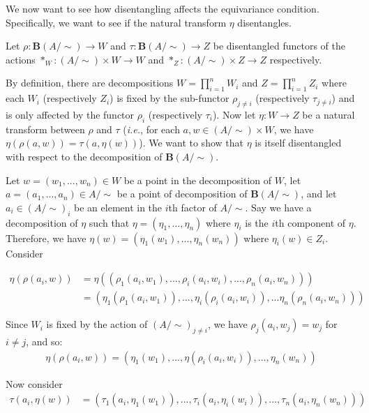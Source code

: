 We now want to see how disentangling affects the equivariance condition. Specifically, we want to see if the natural transform $\eta$ disentangles.

Let $\rho: \textbf{B}(A/\sim) \to W$ and $\tau: \textbf{B}(A/\sim) \to Z$ be disentangled functors of the actions $*_{W}: (A/\sim) \times W \to W$ and $*_{Z}: (A/\sim) \times Z \to Z$ respectively.


By definition, there are decompositions $W = \prod_{i=1}^{n} W_{i}$ and $Z = \prod_{i=1}^{n} Z_{i}$ where each $W_{i}$ (respectively $Z_{i}$) is fixed by the sub-functor $\rho_{j\neq i}$ (respectively $\tau_{j\neq i}$) and is only affected by the functor $\rho_{i}$ (respectively $\tau_{i}$).
Now let $\eta: W \to Z$ be a natural transform between $\rho$ and $\tau$ (\textit{i.e.}, for each $a, w \in (A/\sim) \times W$, we have $\eta(\rho(a, w)) = \tau(a, \eta(w))$).
We want to show that $\eta$ is itself disentangled with respect to the decomposition of $\textbf{B}(A/\sim)$.

Let $w = (w_{1},..., w_{n}) \in W$ be a point in the decomposition of $W$, let $a = (a_{1},...,a_{n}) \in A/\sim$ be a point of decomposition of $\textbf{B}(A/\sim)$, and let $a_{i} \in (A/\sim)_{i}$ be an element in the $i$th factor of $A/\sim$.
Say we have a decomposition of $\eta$ such that $\eta = (\eta_{1}, ..., \eta_{n})$ where $\eta_{i}$ is the $i$th component of $\eta$.
Therefore, we have $\eta(w) = (\eta_{1}(w_{1}), ..., \eta_{n}(w_{n}))$ where $\eta_{i}(w) \in Z_{i}$.
Consider

\begin{align*}
    \eta(\rho(a_{i}, w)) &= \eta((\rho_{1}(a_{i}, w_{1}),..., \rho_{i}(a_{i}, w_{i}), ..., \rho_{n}(a_{i}, w_{n}))) \\
    &= (\eta_{1}(\rho_{1}(a_{i}, w_{1})), ..., \eta_{i}(\rho_{i}(a_{i}, w_{i})), ... \eta_{n}(\rho_{n}(a_{i}, w_{n})))
\end{align*}

Since $W_{i}$ is fixed by the action of $(A/\sim)_{j \neq i}$, we have $\rho_{j}(a_{i}, w_{j}) = w_{j}$ for $i \neq j$, and so:
\begin{align}
    \eta(\rho(a_{i}, w)) = (\eta_{1}(w_{1}), ..., \eta(\rho_{i}(a_{i}, w_{i})), ..., \eta_{n}(w_{n}))
    \label{eqn:disentangling-equivalence-W}
\end{align}

Now consider
\begin{align*}
    \tau(a_{i}, \eta(w)) &= (\tau_{1}(a_{i}, \eta_{1}(w_{1})),..., \tau_{i}(a_{i}, \eta_{i}(w_{i})), ..., \tau_{n}(a_{i}, \eta_{n}(w_{n})))
\end{align*}

